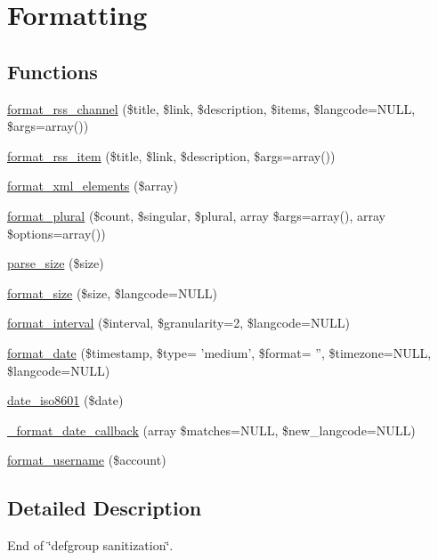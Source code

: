 \hypertarget{group__format}{
\section{Formatting}
\label{group__format}
}
\subsection*{Functions}
\begin{DoxyCompactItemize}
\item 
\hyperlink{group__format_ga44992b971aed4a6a5b8457678f57de50}{format\_\-rss\_\-channel} (\$title, \$link, \$description, \$items, \$langcode=NULL, \$args=array())
\item 
\hyperlink{group__format_ga4ecc9b876a9eaa65abb24ef513b217ad}{format\_\-rss\_\-item} (\$title, \$link, \$description, \$args=array())
\item 
\hyperlink{group__format_gafb344c648e6b63c35950d2889430e4c7}{format\_\-xml\_\-elements} (\$array)
\item 
\hyperlink{group__format_ga215a60b10cd70858e7a268eaf04cbed7}{format\_\-plural} (\$count, \$singular, \$plural, array \$args=array(), array \$options=array())
\item 
\hyperlink{group__format_ga08382023ada29bae2a6a94f22196b066}{parse\_\-size} (\$size)
\item 
\hyperlink{group__format_ga2a0075e7646fa2f399286272faa2956e}{format\_\-size} (\$size, \$langcode=NULL)
\item 
\hyperlink{group__format_ga0615263857988e35c25d84c59a9733a4}{format\_\-interval} (\$interval, \$granularity=2, \$langcode=NULL)
\item 
\hyperlink{group__format_ga40553742a67f9c79c4669b9053fe202c}{format\_\-date} (\$timestamp, \$type= 'medium', \$format= '', \$timezone=NULL, \$langcode=NULL)
\item 
\hyperlink{group__format_gabb13004721c9ab696704c968887d9d79}{date\_\-iso8601} (\$date)
\item 
\hyperlink{group__format_gafbd5625a63c5da6e62dd6a53a314dfcd}{\_\-format\_\-date\_\-callback} (array \$matches=NULL, \$new\_\-langcode=NULL)
\item 
\hyperlink{group__format_ga7124a026ecfacc51c57a75fcc083f136}{format\_\-username} (\$account)
\end{DoxyCompactItemize}


\subsection{Detailed Description}
End of \char`\"{}defgroup sanitization\char`\"{}.

